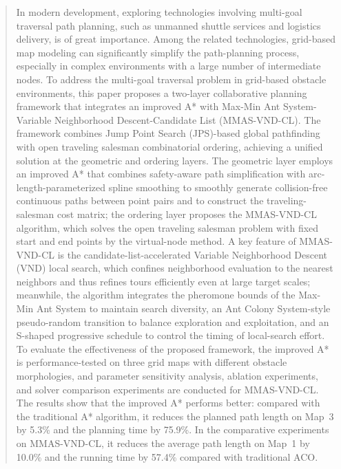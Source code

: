 \begin{abstract}

In modern development, exploring technologies involving multi-goal traversal path planning, such as unmanned shuttle services and logistics delivery, is of great importance. Among the related technologies, grid-based map modeling can significantly simplify the path-planning process, especially in complex environments with a large number of intermediate nodes. To address the multi-goal traversal problem in grid-based obstacle environments, this paper proposes a two-layer collaborative planning framework that integrates an improved A* with Max-Min Ant System-Variable Neighborhood Descent-Candidate List (MMAS-VND-CL). The framework combines Jump Point Search (JPS)-based global pathfinding with open traveling salesman combinatorial ordering, achieving a unified solution at the geometric and ordering layers. The geometric layer employs an improved A* that combines safety-aware path simplification with arc-length-parameterized spline smoothing to smoothly generate collision-free continuous paths between point pairs and to construct the traveling-salesman cost matrix; the ordering layer proposes the MMAS-VND-CL algorithm, which solves the open traveling salesman problem with fixed start and end points by the virtual-node method. A key feature of MMAS-VND-CL is the candidate-list-accelerated Variable Neighborhood Descent (VND) local search, which confines neighborhood evaluation to the nearest neighbors and thus refines tours efficiently even at large target scales; meanwhile, the algorithm integrates the pheromone bounds of the Max-Min Ant System to maintain search diversity, an Ant Colony System-style pseudo-random transition to balance exploration and exploitation, and an S-shaped progressive schedule to control the timing of local-search effort. To evaluate the effectiveness of the proposed framework, the improved A* is performance-tested on three grid maps with different obstacle morphologies, and parameter sensitivity analysis, ablation experiments, and solver comparison experiments are conducted for MMAS-VND-CL. The results show that the improved A* performs better: compared with the traditional A* algorithm, it reduces the planned path length on Map~3 by 5.3\% and the planning time by 75.9\%. In the comparative experiments on MMAS-VND-CL, it reduces the average path length on Map~1 by 10.0\% and the running time by 57.4\% compared with traditional ACO.

\end{abstract}

